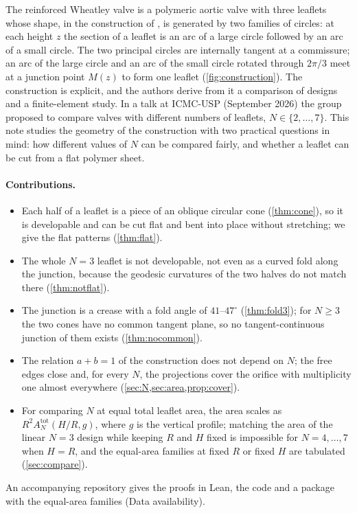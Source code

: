 \documentclass[11pt,a4paper]{article}
\theoremstyle{plain}
\theoremstyle{remark}
\begin{document}
The reinforced Wheatley valve is a polymeric aortic valve with three leaflets whose shape, in the construction of
\citet{McKee2026}, is generated by two families of circles: at each height $z$ the section of a leaflet is an arc of a
large circle followed by an arc of a small circle. The two principal circles are internally tangent at a commissure; an arc of
the large circle and an arc of the small circle rotated through $2\pi/3$ meet at a junction point $M(z)$ to form one leaflet
(\cref{fig:construction}). The construction is explicit, and the authors derive
from it a comparison of designs and a finite-element study. In a talk at ICMC-USP (September 2026) the group proposed to
compare valves with different numbers of leaflets, $N\in\{2,\dots,7\}$. This note studies the geometry of the construction
with two practical questions in mind: how different values of $N$ can be compared fairly, and whether a leaflet can be cut
from a flat polymer sheet.

\paragraph{Contributions.}
\begin{itemize}
\item Each half of a leaflet is a piece of an oblique circular cone (\cref{thm:cone}), so it is developable and can be
  cut flat and bent into place without stretching; we give the flat patterns (\cref{thm:flat}).
\item The whole $N=3$ leaflet is not developable, not even as a curved fold along the junction, because the geodesic
  curvatures of the two halves do not match there (\cref{thm:notflat}).
\item The junction is a crease with a fold angle of $41$--$47^\circ$ (\cref{thm:fold3}); for $N\ge3$ the two cones have no
  common tangent plane, so no tangent-continuous junction of them exists (\cref{thm:nocommon}).
\item The relation $a+b=1$ of the construction does not depend on $N$; the free edges close and, for every $N$, the projections
  cover the orifice with multiplicity one almost everywhere (\cref{sec:N,sec:area,prop:cover}).
\item For comparing $N$ at equal total leaflet area, the area scales as $R^2A^{\mathrm{tot}}_N(H/R,g)$, where $g$ is the
  vertical profile; matching the area of the linear $N=3$ design while keeping $R$ and $H$ fixed is impossible for
  $N=4,\dots,7$ when $H=R$, and the equal-area families at fixed $R$ or fixed $H$ are tabulated (\cref{sec:compare}).
\end{itemize}
An accompanying repository gives the proofs in Lean, the code and a package with the equal-area families (Data availability).
\end{document}
